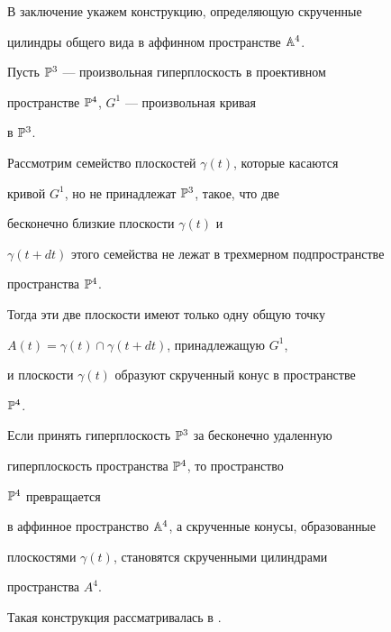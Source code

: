 В заключение укажем конструкцию, определяющую скрученные


цилиндры общего вида в аффинном пространстве ${\Bbb A}^4$.


Пусть ${\Bbb P}^3$ --- произвольная гиперплоскость в проективном


пространстве  ${\Bbb P}^4$, $G^1$ --- произвольная кривая


в ${\Bbb P}^3$.


Рассмотрим семейство плоскостей  $\gamma(t)$, которые касаются


кривой $G^1$, но не принадлежат ${\Bbb P}^3$, такое, что две


бесконечно близкие плоскости $\gamma (t)$ и


$\gamma (t+dt)$ этого семейства не лежат в трехмерном подпространстве


пространства ${\Bbb P}^4$.


Тогда эти две плоскости имеют только одну общую точку


$A (t) =  \gamma (t) \cap \gamma (t+dt)$, принадлежащую $G^1$,


и плоскости $\gamma (t)$ образуют скрученный конус в пространстве


${\Bbb P}^4$.


Если принять гиперплоскость ${\Bbb P}^3$ за бесконечно удаленную


гиперплоскость пространства ${\Bbb P}^4$, то пространство


${\Bbb P}^4$ превращается


в аффинное пространство ${\Bbb A}^4$, а скрученные конусы, образованные


плоскостями $\gamma (t)$, становятся скрученными цилиндрами


пространства $A^4$.


Такая конструкция рассматривалась в \cite{A87}.














